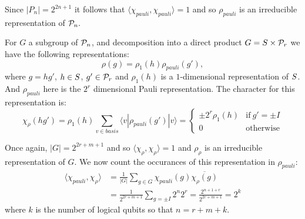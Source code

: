 \documentclass[12pt,notitlepage,longbibliography,nofootinbib,tightenlines]{revtex4}
\begin{document}
Since $|P_n|=2^{2n+1}$ it follows that
$\langle\chi_{pauli},\chi_{pauli}\rangle = 1$ and
so $\rho_{pauli}$ is an irreducible representation of $\mathcal{P}_n.$

For $G$ a subgroup of $\mathcal{P}_n$, and decomposition
into a direct product $G=S\times \mathcal{P}_r$ we have the
following representations:
$$
    \rho(g) = \rho_1(h) \rho_{pauli}(g'),
$$
where $g=hg'$, $h\in S$, $g'\in \mathcal{P}_r$ and $\rho_1(h)$ is
a $1$-dimensional representation of $S$.
And $\rho_{pauli}$ here is the $2^r$ dimensional Pauli representation.
The character for this representation is:
$$
\chi_{{\rho}}(hg') = \rho_1(h) \sum_{v \in basis} \langle v | \rho_{{pauli}}(g') | v \rangle
    = \left\{ \begin{array}{ll}
 \pm 2^r\rho_1(h) &\mbox{if}\ g'=\pm I\\
 0 &\mbox{otherwise}\end{array}\right.
$$

Once again, $|G|=2^{2r+m+1}$ and so
$\langle\chi_{\rho},\chi_{\rho}\rangle = 1$ and
$\rho_{\rho}$ is an irreducible representation of $G.$
We now count the occurances of 
this representation in $\rho_{pauli}$:
\begin{align*}
\langle\chi_{pauli},\chi_{\rho}\rangle &= \frac{1}{|G|}\sum_{g\in G} \chi_{pauli}(g)\overline{\chi_{\rho}(g)} \\
&= \frac{1}{2^{2r+m+1}} \sum_{g=\pm I} 2^n 2^r = \frac{2^{n+1+r}}{2^{2r+m+1}} = 2^k
\end{align*}
where $k$ is the number of logical qubits so that $n=r+m+k.$

{}

\end{document}
